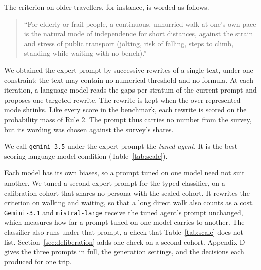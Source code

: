 The criterion on older travellers, for instance, is worded as follows.

\begin{quote}
``For elderly or frail people, a continuous, unhurried walk at one's own pace is the natural
mode of independence for short distances, against the strain and stress of public transport
(jolting, risk of falling, steps to climb, standing while waiting with no bench).''
\end{quote}

We obtained the expert prompt by successive rewrites of a single text, under one constraint:
the text may contain no numerical threshold and no formula. At each iteration, a language
model reads the gaps per stratum of the current prompt and proposes one targeted rewrite. The
rewrite is kept when the over-represented mode shrinks. Like every score in the benchmark,
each rewrite is scored on the probability mass of Rule 2. The prompt thus carries no number
from the survey, but its wording was chosen against the survey's shares.

We call \texttt{gemini-3.5} under the expert prompt the \emph{tuned agent}. It is the
best-scoring language-model condition (Table~\ref{tab:scale}).

Each model has its own biases, so a prompt tuned on one model need not suit another. We tuned
a second expert prompt for the typed classifier, on a calibration cohort that shares no
persona with the sealed cohort. It rewrites the criterion on walking and waiting, so that a
long direct walk also counts as a cost. \texttt{Gemini-3.1} and \texttt{mistral-large} receive
the tuned agent's prompt unchanged, which measures how far a prompt tuned on one model carries
to another. The classifier also runs under that prompt, a check that Table~\ref{tab:scale}
does not list. Section~\ref{sec:deliberation} adds one check on a second cohort. Appendix D
gives the three prompts in full, the generation settings, and the decisions each produced for
one trip.
